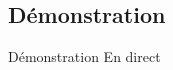\documentclass{beamer} %
\begin{document}

\subsection{Démonstration}

\begin{frame}{Démonstration}
    En direct
\end{frame}
\end{document}
